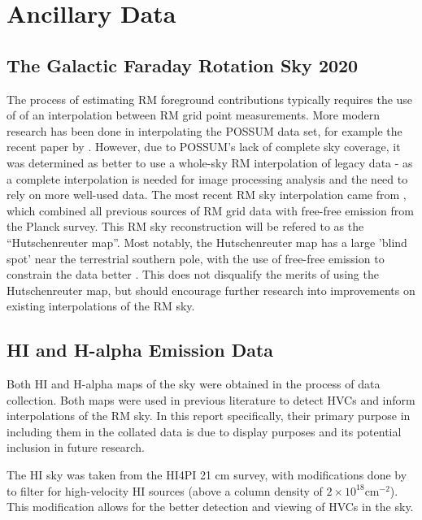 \section{Ancillary Data}
\label{sec:data}

\subsection{The Galactic Faraday Rotation Sky 2020}
\label{ssec:legacy}

The process of estimating RM foreground contributions typically requires the use of of an interpolation between RM grid point measurements. More modern research has been done in interpolating the POSSUM data set, for example the recent paper by \cite{ID58}. However, due to POSSUM's lack of complete sky coverage, it was determined as better to use a whole-sky RM interpolation of legacy data - as a complete interpolation is needed for image processing analysis and the need to rely on more well-used data. The most recent RM sky interpolation came from \cite{ID44, ID45}, which combined all previous sources of RM grid data with free-free emission from the Planck survey. This RM sky reconstruction will be refered to as the “Hutschenreuter map”. Most notably, the Hutschenreuter map has a large 'blind spot' near the terrestrial southern pole, with the use of free-free emission to constrain the data better \citep{ID44, ID45}. This does not disqualify the merits of using the Hutschenreuter map, but should encourage further research into improvements on existing interpolations of the RM sky.

\subsection{HI and H-alpha Emission Data}
\label{ssec:other_data}

Both HI and H-alpha maps of the sky were obtained in the process of data collection. Both maps were used in previous literature to detect HVCs and inform interpolations of the RM sky. In this report specifically, their primary purpose in including them in the collated data is due to display purposes and its potential inclusion in future research. 


The HI sky was taken from the HI4PI 21 cm survey, with modifications done by \cite{ID6} to filter for high-velocity HI sources (above a column density of $2\times 10^{18} \mathrm{cm}^{-2}$). This modification allows for the better detection and viewing of HVCs in the sky.


